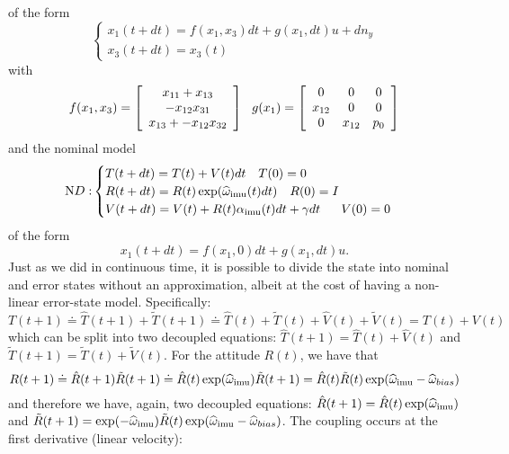 {of the form
\begin{equation}
\begin{cases}
x_1(t+dt) = f(x_1, x_3)dt + g(x_1,dt)u + dn_y \\
x_3(t+dt) = x_3(t)
\end{cases}
\end{equation}
with 
\begin{equation}
f(x_1, x_3)  =\ba{c}
x_{11}+x_{13} \\ 
-x_{12}x_{31} \\
x_{13} + -x_{12 } x_{32} \ea
~~ g(x_1) = \ba{ccc}
0 & 0 & 0 \\
x_{12} & 0 & 0 \\
0 & x_{12} & p_0 \ea
\end{equation}
and the nominal model
\begin{equation}
{\mathrm ND:}
\begin{cases}
T(t+dt) = T(t) + V(t)dt ~~~ T(0) = 0\\
R(t+dt) = R(t)\exp(\widehat \w\imu (t)dt )~~~ R(0) = I \\
V(t+dt) = V(t) + R(t)\alpha\imu (t)dt + \gamma dt ~~~~~ V(0) = 0 \\
\end{cases}
\end{equation}
of the form
\begin{equation}
x_1(t+dt) = f(x_1, 0)dt + g(x_1,dt) u.
\end{equation}
Just as we did in continuous time, it is possible  to divide the state into nominal and error states without an approximation, albeit at the cost of having a non-linear error-state model. Specifically:
\begin{equation}
T(t+1) \doteq \hat T(t+1) + \tilde T(t+1) \doteq \hat T(t) + \tilde T(t) + \hat V(t) + \tilde V(t) = T(t) + V(t)
\end{equation}
which can be split into two decoupled equations: $\hat T(t+1) = \hat T(t) + \hat V(t)$ and $\tilde T(t+1) = \tilde T(t) + \tilde V(t)$. For the attitude $R(t)$, we have that
\begin{equation}
R(t+1) \doteq \hat R(t+1)\tilde R(t+1) \doteq \hat R(t)\exp(\widehat \w\imu ) \tilde R(t+1) = 
\hat R(t) \tilde R(t) \exp(\widehat \w\imu  - \widehat \w_{bias})
\end{equation}
and therefore we have, again, two decoupled equations: $\hat R(t+1) = \hat R(t)\exp(\widehat \w\imu )$ and $\tilde R(t+1) = \exp(-\widehat \w\imu )\tilde R(t) \exp(\widehat \w\imu  - \widehat \w_{bias})$. The coupling occurs at the first derivative (linear velocity):
}
